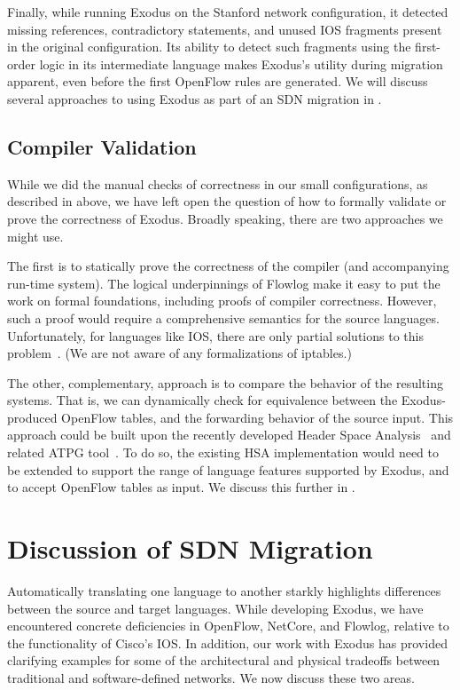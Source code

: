Finally, while running Exodus on the Stanford network configuration, it detected
missing references, contradictory statements, and unused IOS fragments present
in the original configuration.
Its ability to detect such fragments using the first-order logic in its intermediate
language makes Exodus's utility during migration apparent, even before the first
OpenFlow rules are generated.
We will discuss several approaches to using Exodus as part of an SDN
migration in .

\section{Compiler Validation}

While we did the manual checks of correctness in our small configurations, 
as described in  above, we have left open the question 
of how to formally validate or prove the correctness of
Exodus. Broadly speaking, there are two approaches we might use.

The first is to statically prove the correctness of the compiler (and
accompanying run-time system). The logical underpinnings of Flowlog
make it easy to put the work on formal foundations, including proofs
of compiler correctness. However, such a proof would require a
comprehensive semantics for the source languages. Unfortunately, for
languages like IOS, there are only partial
solutions to this problem~\cite{capretta++:fmse07-firewalls,n++:lisa-margrave-firewalls,zhang++:icnp2012-firewalls}.
(We are not aware of any formalizations of
iptables.)

The other, complementary, approach is to compare the behavior of the
resulting systems. That is, we can
dynamically check for equivalence between the Exodus-produced
OpenFlow tables, and the forwarding behavior of the source input.
This approach could be built upon the recently developed Header
Space Analysis~\cite{kazemian:nsdi12-hsa} and related
ATPG tool~\cite{zeng12test}. To do so, the existing
HSA implementation would need to be extended to support the range of
language features supported by Exodus, and to accept OpenFlow tables
as input. We discuss this further in .


\chapter{Discussion of SDN Migration}
\label{sec:tradeoffs}

Automatically translating one language to another starkly highlights differences
between the source and target languages.
While developing Exodus, we have encountered concrete deficiencies in OpenFlow,
NetCore, and Flowlog, relative to the functionality of Cisco's IOS.
In addition, our work with Exodus has provided clarifying examples for some of the architectural and
physical tradeoffs between traditional and software-defined networks.
We now discuss these two areas.

